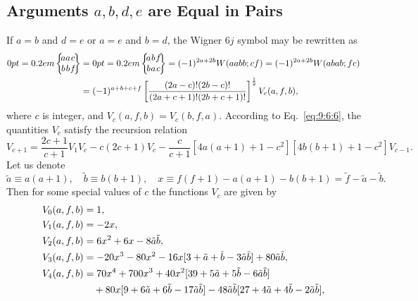\subsection{Arguments $a, b, d, e$ are Equal in Pairs}\label{sec:9.5.4}
If $a=b$ and $d=e$ or $a=e$ and $b=d$, the Wigner $6 j$ symbol may be rewritten as \cite{ref056}
\begin{align}
\sixj{a}{a}{c}{b}{b}{f} & =\sixj{a}{b}{f}{b}{a}{c}=(-1)^{2 a+2 b} W(a a b b ; c f)=(-1)^{2 a+2 b} W(a b a b ; f c)  \notag\\
& =(-1)^{a+b+c+f}\left[\frac{(2 a-c)!(2 b-c)!}{(2 a+c+1)!(2 b+c+1)!}\right]^{\frac{1}{2}} V_{c}(a, f, b), \label{eq:9:5:21}
\end{align}
where $c$ is integer, and $V_{c}(a, f, b)=V_{c}(b, f, a)$. According to Eq.~\eqref{eq:9:6:6}, the quantities $V_{c}$ satisfy the recursion relation
\begin{equation}
V_{c+1}=\frac{2 c+1}{c+1} V_{1} V_{c}-c(2 c+1) V_{c}-\frac{c}{c+1}\left[4 a(a+1)+1-c^{2}\right]\left[4 b(b+1)+1-c^{2}\right] V_{c-1}. \label{eq:9:5:22}
\end{equation}
Let us denote
\begin{equation}
\tilde{a} \equiv a(a+1), \quad \tilde{b} \equiv b(b+1), \quad x \equiv f(f+1)-a(a+1)-b(b+1)=\tilde{f}-\tilde{a}-\tilde{b}. \label{eq:9:5:23}
\end{equation}
Then for some special values of $c$ the functions $V_{c}$ are given by
\begin{align}
V_{0}(a, f, b)&=1, \\
V_{1}(a, f, b)&=-2 x, \\
V_{2}(a, f, b)&=6 x^{2}+6 x-8 \tilde{a} \tilde{b}, \\
V_{3}(a, f, b)&=-20 x^{3}-80 x^{2}-16 x[3+\tilde{a}+\tilde{b}-3 \tilde{a} \tilde{b}]+80 \tilde{a} \tilde{b}, \\
V_{4}(a, f, b)&=70 x^{4}+700 x^{3}+40 x^{2}[39+5 \tilde{a}+5 \tilde{b}-6 \tilde{a} \tilde{b}] \notag\\
&\quad+80 x[9+6 \tilde{a}+6 \tilde{b}-17 \tilde{a} \tilde{b}]-48 \tilde{a} \tilde{b}[27+4 \tilde{a}+4 \tilde{b}-2 \tilde{a} \tilde{b}],
  \label{eq:9:5:28}
\end{align}
